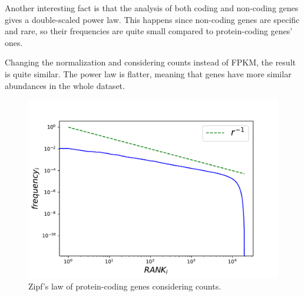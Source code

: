 Another interesting fact is that the analysis of both coding and non-coding genes gives a double-scaled power law. This happens since non-coding genes are specific and rare, so their frequencies are quite small compared to protein-coding genes' ones.

Changing the normalization and considering counts instead of FPKM, the result is quite similar. The power law is flatter, meaning that genes have more similar abundances in the whole dataset. 
\begin{figure}[htb!]
    \centering
    \includegraphics[width=0.8\linewidth]{pictures/structure/tcga/globalzipf_counts.pdf}
    \caption{Zipf's law of protein-coding genes considering counts.}
    \label{fig:structure/tcga/globalzipf_count}
\end{figure}

